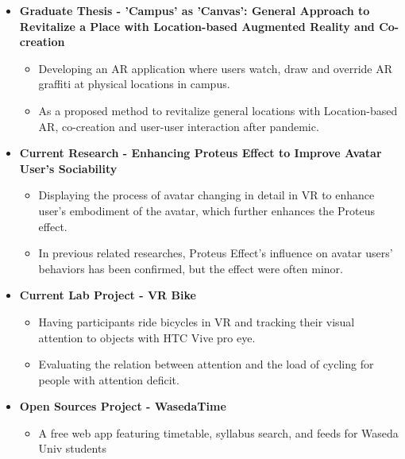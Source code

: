 \begin{itemize}[leftmargin=*]
    \item{\textbf{Graduate Thesis - 'Campus' as 'Canvas': General Approach to Revitalize a Place with Location-based Augmented Reality and Co-creation}}
        \begin{itemize}
                \vspace{-5pt}
                \item Developing an AR application where users watch, draw and override AR graffiti at physical locations in campus.
                \item As a proposed method to revitalize general locations with Location-based AR, co-creation and user-user interaction after pandemic.
        \end{itemize}
    \vspace{-10pt}
    \item{\textbf{Current Research - Enhancing Proteus Effect to Improve Avatar User's Sociability}}
        \begin{itemize}
                \vspace{-5pt}
                \item Displaying the process of avatar changing in detail in VR to enhance user's embodiment of the avatar, which further enhances the Proteus effect.
                \item In previous related researches, Proteus Effect's influence on avatar users' behaviors has been confirmed, but the effect were often minor.
        \end{itemize}
    \vspace{-10pt}
    \item{\textbf{Current Lab Project - VR Bike}}
        \begin{itemize}
                \vspace{-5pt}
                \item Having participants ride bicycles in VR and tracking their visual attention to objects with HTC Vive pro eye.
                \item Evaluating the relation between attention and the load of cycling for people with attention deficit.
        \end{itemize}
    \vspace{-10pt}
    \item{\textbf{Open Sources Project - WasedaTime}}
        \begin{itemize}
                \vspace{-5pt}
                \item A free web app featuring timetable, syllabus search, and feeds for Waseda Univ students

\end{itemize}
\end{itemize}
